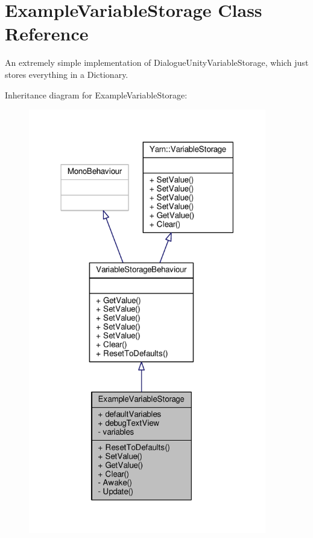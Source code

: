 \hypertarget{a00087}{\section{Example\-Variable\-Storage Class Reference}
\label{a00087}
}


An extremely simple implementation of Dialogue\-Unity\-Variable\-Storage, which just stores everything in a Dictionary.  




Inheritance diagram for Example\-Variable\-Storage\-:
\nopagebreak
\begin{figure}[H]
\begin{center}
\leavevmode
\includegraphics[width=294pt]{a00370}
\end{center}
\end{figure}


